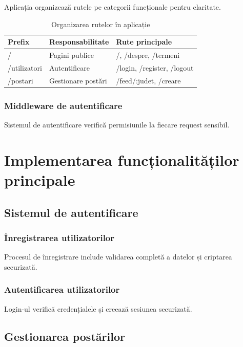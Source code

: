 \documentclass[12pt,a4paper]{report}
\begin{document}
Aplicația organizează rutele pe categorii funcționale pentru claritate.

\begin{table}[H]
\centering
\caption{Organizarea rutelor în aplicație}
\label{tab:route_organization}
\begin{tabular}{|l|l|p{6cm}|}
\hline
\textbf{Prefix} & \textbf{Responsabilitate} & \textbf{Rute principale} \\
\hline
/ & Pagini publice & /, /despre, /termeni \\
\hline
/utilizatori & Autentificare & /login, /register, /logout \\
\hline
/postari & Gestionare postări & /feed/:judet, /creare \\
\hline
\end{tabular}
\end{table}

\subsubsection{Middleware de autentificare}

Sistemul de autentificare verifică permisiunile la fiecare request sensibil.

\section{Implementarea funcționalităților principale}

\subsection{Sistemul de autentificare}

\subsubsection{Înregistrarea utilizatorilor}

Procesul de înregistrare include validarea completă a datelor și criptarea securizată.

\subsubsection{Autentificarea utilizatorilor}

Login-ul verifică credențialele și creează sesiunea securizată.

\subsection{Gestionarea postărilor}
\end{document}
